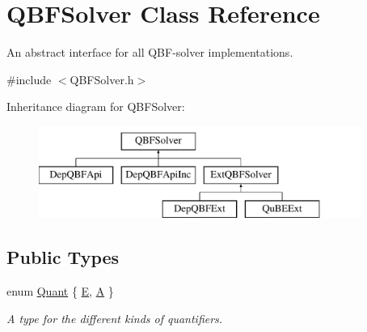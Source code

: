 \hypertarget{classQBFSolver}{\section{Q\-B\-F\-Solver Class Reference}
\label{classQBFSolver}
}


An abstract interface for all Q\-B\-F-\/solver implementations.  




{\ttfamily \#include $<$Q\-B\-F\-Solver.\-h$>$}

Inheritance diagram for Q\-B\-F\-Solver\-:\begin{figure}[H]
\begin{center}
\leavevmode
\includegraphics[height=3.000000cm]{classQBFSolver}
\end{center}
\end{figure}
\subsection*{Public Types}
\begin{DoxyCompactItemize}
\item 
enum \hyperlink{classQBFSolver_ac091e263cb55286cc07b2451bcf4d3c7}{Quant} \{ \hyperlink{classQBFSolver_ac091e263cb55286cc07b2451bcf4d3c7a090ab4a5b262710ccd80e97d72f9a7b3}{E}, 
\hyperlink{classQBFSolver_ac091e263cb55286cc07b2451bcf4d3c7afd6518d5d985aa8346ac071e4c0d8ee0}{A}
 \}
\begin{DoxyCompactList}\small\item\em A type for the different kinds of quantifiers. \end{DoxyCompactList}\end{DoxyCompactItemize}
